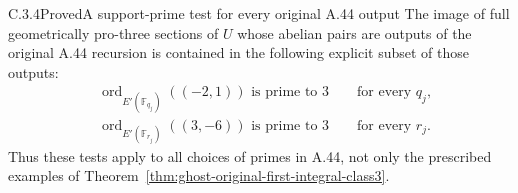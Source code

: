 \begin{result}{C.3.4}{Proved}{A support-prime test for every original A.44 output}
\label{prop:ghost-elliptic-support-test}
The image of full geometrically pro-three sections
of \(U\) whose abelian pairs are outputs of the
original A.44 recursion is contained in the following
explicit subset of those outputs:
\[
 \begin{split}
 &\operatorname{ord}_{E'(\mathbb F_{q_j})}((-2,1))
                              \text{ is prime to }3
                              \qquad\text{for every }q_j,\\
 &\operatorname{ord}_{E'(\mathbb F_{r_j})}((3,-6))
                              \text{ is prime to }3
                              \qquad\text{for every }r_j.
 \end{split}                                            \tag{16}
\]
Thus these tests apply to all choices of primes in
A.44, not only the prescribed examples of
Theorem~\ref{thm:ghost-original-first-integral-class3}.
\end{result}
